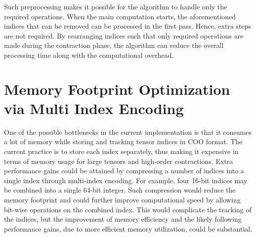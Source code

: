 \noindent
Such preprocessing makes it possible for the algorithm to handle only the required operations.
When the main computation starts, the aforementioned indices that can be removed can be
processed in the first pass. Hence, extra steps are not required. By rearranging indices
such that only required operations are made during the contraction phase, the algorithm can
reduce the overall processing time along with the computational overhead.

\section{Memory Footprint Optimization via Multi Index Encoding}
One of the possible bottlenecks in the current implementation is that it consumes a lot of
memory while storing and tracking tensor indices in COO format. The current practice is to
store each index separately, thus making it expensive in terms of memory usage for large
tensors and high-order contractions. Extra performance gains could be attained by compressing
a number of indices into a single index through multi-index encoding. For example, four
16-bit indices may be combined into a single 64-bit integer. Such compression would reduce
the memory footprint and could further improve computational speed by allowing bit-wise
operations on the combined index. This would complicate the tracking of the indices, but the
improvement of memory efficiency and the likely following performance gains, due to more efficient
memory utilization, could be substantial.